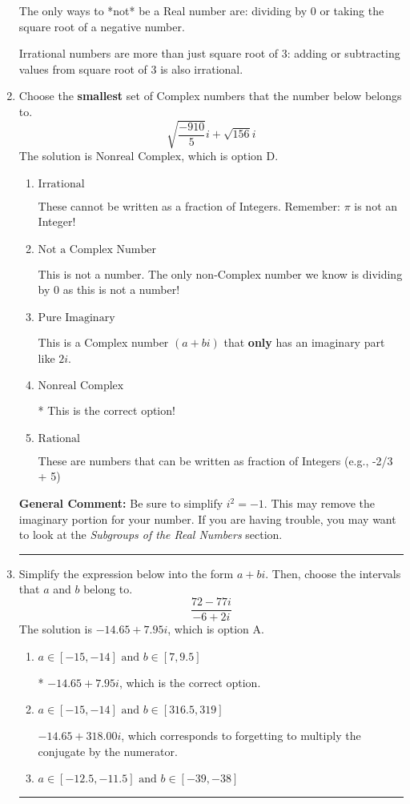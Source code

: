\documentclass{extbook}[14pt]
\newcommand{\litem}[1]{\item #1

\rule{\textwidth}{0.4pt}}
\begin{document}
\begin{enumerate}
{ The only ways to *not* be a Real number are: dividing by 0 or taking the square root of a negative number. 
 
 Irrational numbers are more than just square root of 3: adding or subtracting values from square root of 3 is also irrational.
}
\litem{
Choose the \textbf{smallest} set of Complex numbers that the number below belongs to.
\[ \sqrt{\frac{-910}{5}} i+\sqrt{156}i \]The solution is \( \text{Nonreal Complex} \), which is option D.\begin{enumerate}[label=\Alph*.]
\item \( \text{Irrational} \)

These cannot be written as a fraction of Integers. Remember: $\pi$ is not an Integer!
\item \( \text{Not a Complex Number} \)

This is not a number. The only non-Complex number we know is dividing by 0 as this is not a number!
\item \( \text{Pure Imaginary} \)

This is a Complex number $(a+bi)$ that \textbf{only} has an imaginary part like $2i$.
\item \( \text{Nonreal Complex} \)

* This is the correct option!
\item \( \text{Rational} \)

These are numbers that can be written as fraction of Integers (e.g., -2/3 + 5)
\end{enumerate}

\textbf{General Comment:} Be sure to simplify $i^2 = -1$. This may remove the imaginary portion for your number. If you are having trouble, you may want to look at the \textit{Subgroups of the Real Numbers} section.
}
\litem{
Simplify the expression below into the form $a+bi$. Then, choose the intervals that $a$ and $b$ belong to.
\[ \frac{72 - 77 i}{-6 + 2 i} \]The solution is \( -14.65  + 7.95 i \), which is option A.\begin{enumerate}[label=\Alph*.]
\item \( a \in [-15, -14] \text{ and } b \in [7, 9.5] \)

* $-14.65  + 7.95 i$, which is the correct option.
\item \( a \in [-15, -14] \text{ and } b \in [316.5, 319] \)

 $-14.65  + 318.00 i$, which corresponds to forgetting to multiply the conjugate by the numerator.
\item \( a \in [-12.5, -11.5] \text{ and } b \in [-39, -38] \)


\end{enumerate}}
\end{enumerate}
\end{document}
